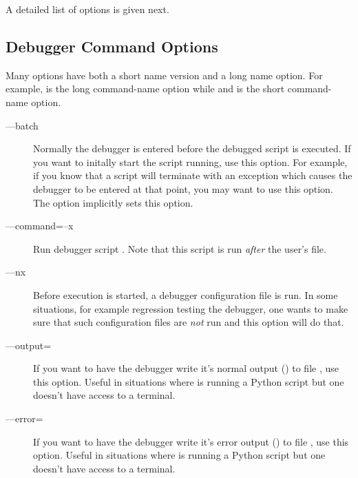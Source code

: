 A detailed list of options is given next.

\subsection{Debugger Command Options\label{subsection:command-options}}

Many options have both a short name version and a long name
option. For example,  is the long command-name option
while and  is the short command-name option.

\begin{description} 

\item[--{}--batch]

Normally the debugger is entered before the debugged script is
executed. If you want to initally start the script running, use this
option. For example, if you know that a script will terminate with an
exception which causes the debugger to be entered at that point, you
may want to use this option. The  option implicitly
sets this option.

\item[--{}--command=\code{\Large{|}}--x ]\label{switch:command}

Run debugger script . Note that this script is run
\emph{after} the user's  file.

\item[--{}--nx\code{\Large{|}}]\label{switch:nx}

Before execution is started, a debugger configuration file
 is run. In some situations, for example regression
testing the debugger, one wants to make sure that such configuration
files are \emph{not} run and this option will do that.

\item[--{}--output=]

If you want to have the debugger write it's normal output
() to file , use this option. Useful in
situations where is running a Python script but one doesn't have
access to a terminal.

\item[--{}--error=]

If you want to have the debugger write it's error output
() to file , use this option. Useful in
situations where is running a Python script but one doesn't have
access to a terminal.


\end{description}
